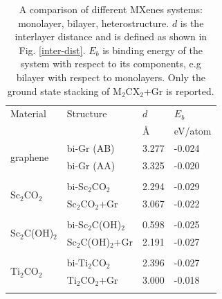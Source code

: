 \begin{table}[htb]
\centering
\caption{A comparison of different MXenes systems: monolayer, bilayer, heterostructure. $d$ is the interlayer distance and is defined as shown in Fig. \ref{inter-dist}. $E_b$ is binding energy of the system with respect to its components, e.g bilayer with respect to monolayers. Only the ground state stacking of M$_2$CX$_2$+Gr is reported.} 
\label{tableI}
\begin{tabularx}{\linewidth}{XXXX}
\hline
Material      & Structure                         & $d$               & $E_b$               \\
              &                                    & \AA                & eV/atom \\ \hline
\multirow{2}{*}{graphene}      & bi-Gr (AB)                                               & 3.277                    & -0.024                        \\
              & bi-Gr (AA)                                                & 3.325                    & -0.020                         \\ \multicolumn{4}{c}{}\\
\multirow{2}{*}{Sc$_2$CO$_2$}    & bi-Sc$_2$CO$_2$                                                   & 2.294                 & -0.029                         \\
              & Sc$_2$CO$_2$+Gr                                                   & 3.067                   & -0.022                         \\
\multicolumn{4}{c}{}\\              
\multirow{2}{*}{Sc$_2$C(OH)$_2$} & bi-Sc$_2$C(OH)$_2$                                                   & 0.598                  & -0.025                         \\
              & Sc$_2$C(OH)$_2$+Gr                                                     & 2.191                  & -0.027                         \\
\multicolumn{4}{c}{}\\              
\multirow{2}{*}{Ti$_2$CO$_2$}    & bi-Ti$_2$CO$_2$                                                & 2.396                   & -0.027                         \\
              & Ti$_2$CO$_2$+Gr                                                   & 3.000                    & -0.018                         \\
\multicolumn{4}{c}{}\\              

\end{tabularx}
\end{table}
